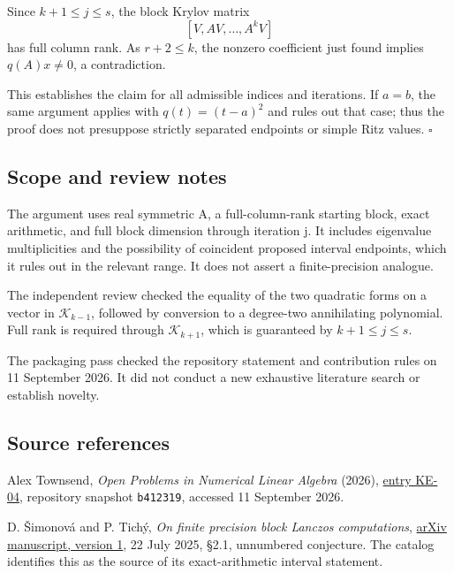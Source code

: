 \documentclass[10pt,a4paper]{article}
\begin{document}
Since \(k+1\le j\le s\), the block Krylov matrix \[
[V,AV,\ldots,A^kV]
\] has full column rank. As \(r+2\le k\), the nonzero coefficient just
found implies \(q(A)x\ne0\), a contradiction.

This establishes the claim for all admissible indices and iterations. If
\(a=b\), the same argument applies with \(q(t)=(t-a)^2\) and rules out
that case; thus the proof does not presuppose strictly separated
endpoints or simple Ritz values. \(\square\)

\subsection{Scope and review notes}\label{scope-and-review-notes}

The argument uses real symmetric A, a full-column-rank starting block,
exact arithmetic, and full block dimension through iteration j. It
includes eigenvalue multiplicities and the possibility of coincident
proposed interval endpoints, which it rules out in the relevant range.
It does not assert a finite-precision analogue.

The independent review checked the equality of the two quadratic forms
on a vector in \(\mathcal K_{k-1}\), followed by conversion to a
degree-two annihilating polynomial. Full rank is required through
\(\mathcal K_{k+1}\), which is guaranteed by \(k+1\le j\le s\).

The packaging pass checked the repository statement and contribution
rules on 11 September 2026. It did not conduct a new exhaustive
literature search or establish novelty.

\subsection{Source references}\label{source-references}

Alex Townsend, \emph{Open Problems in Numerical Linear Algebra} (2026),
\href{https://github.com/ajt60gaibb/OpenProblemsInNLA/blob/b4123194697bdf6f8f82518c1dd7d6c40a30c2e0/eigenvalues-and-inverse-problems/KE-04/README.md}{entry
KE-04}, repository snapshot \texttt{b412319}, accessed 11 September
2026.

D. Šimonová and P. Tichý, \emph{On finite precision block Lanczos
computations}, \href{https://arxiv.org/abs/2507.16484v1}{arXiv
manuscript, version 1}, 22 July 2025, §2.1, unnumbered conjecture. The
catalog identifies this as the source of its exact-arithmetic interval
statement.
\end{document}
